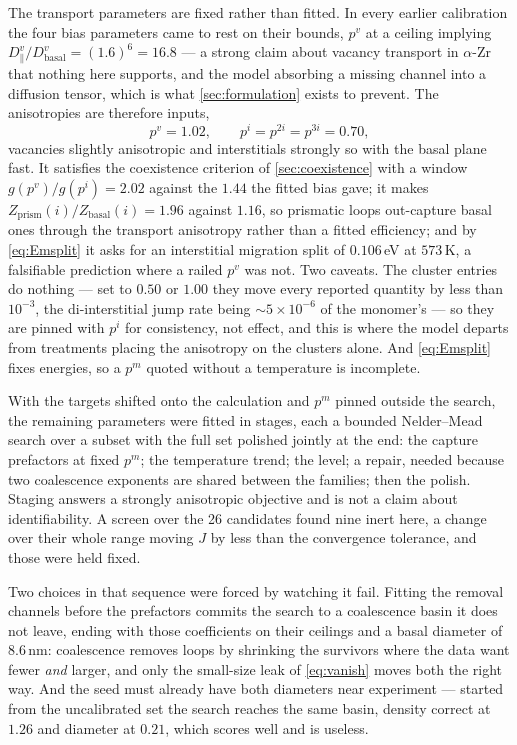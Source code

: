 The transport parameters are fixed rather than fitted. In every earlier
calibration the four bias parameters came to rest on their bounds, $p^{v}$ at a
ceiling implying $D^{v}_{\parallel}/D^{v}_{\mathrm{basal}}=(1.6)^{6}=16.8$ --- a
strong claim about vacancy transport in $\alpha$-Zr that nothing here supports,
and the model absorbing a missing channel into a diffusion tensor, which is what
\cref{sec:formulation} exists to prevent. The anisotropies are therefore
inputs,
\begin{equation}
  p^{v}=1.02,\qquad p^{i}=p^{2i}=p^{3i}=0.70,
  \label{eq:pinned-pm}
\end{equation}
vacancies slightly anisotropic and interstitials strongly so with the basal
plane fast. It satisfies the coexistence criterion of \cref{sec:coexistence}
with a window $g(p^{v})/g(p^{i})=2.02$ against the $1.44$ the fitted bias gave;
it makes $Z_{\mathrm{prism}}(i)/Z_{\mathrm{basal}}(i)=1.96$ against $1.16$, so
prismatic loops out-capture basal ones through the transport anisotropy rather
than a fitted efficiency; and by \cref{eq:Emsplit} it asks for an interstitial
migration split of $0.106\,$eV at $573\,$K, a falsifiable prediction where a
railed $p^{v}$ was not. Two caveats. The cluster entries do nothing --- set to $0.50$ or $1.00$ they
move every reported quantity by less than $10^{-3}$, the di-interstitial jump
rate being $\sim\!5\times10^{-6}$ of the monomer's --- so they are pinned with
$p^{i}$ for consistency, not effect, and this is where the model departs from
treatments placing the anisotropy on the clusters alone. And \cref{eq:Emsplit}
fixes energies, so a $p^{m}$ quoted without a temperature is incomplete.

\label{sec:search}
With the targets shifted onto the calculation and $p^{m}$ pinned outside the
search, the remaining parameters were fitted in stages, each a bounded Nelder--Mead
search over a subset with the full set polished jointly at the end: the capture
prefactors at fixed $p^{m}$; the \aloop{} temperature trend; the \aloop{} level;
a \cloop{} repair, needed because two coalescence exponents are shared between
the families; then the polish. Staging answers a strongly anisotropic objective
and is not a claim about identifiability. A screen over the 26 candidates found
nine inert here, a change over their whole range moving $J$ by less than the
convergence tolerance, and those were held fixed.

Two choices in that sequence were forced by watching it fail. Fitting the
\cloop{} removal channels before the prefactors commits the search to a
coalescence basin it does not leave, ending with those coefficients on their
ceilings and a basal diameter of $8.6\,$nm: coalescence removes loops by
shrinking the survivors where the data want fewer \emph{and} larger, and only
the small-size leak of \cref{eq:vanish} moves both the right way. And the seed
must already have both diameters near experiment --- started from the
uncalibrated set the search reaches the same basin, \cloop{} density correct at
$1.26$ and diameter at $0.21$, which scores well and is useless.


